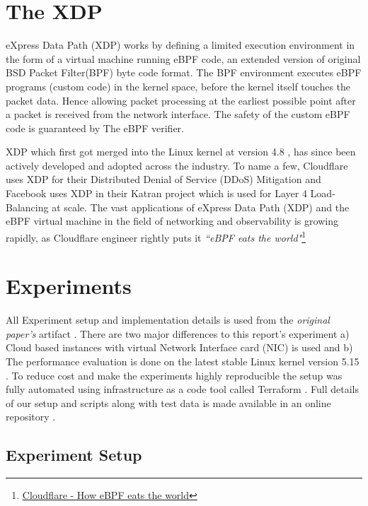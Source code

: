 \documentclass[12pt,titlepage]{article}
\begin{document}
\section{The XDP}

eXpress Data Path (XDP) works by defining a limited execution environment in the form of a virtual machine running eBPF code, an extended version of original BSD Packet Filter(BPF) \cite{mccanne_bsd_1993} byte code format.  The BPF environment executes eBPF programs (custom code) in the kernel space, before the kernel itself touches the packet data. Hence allowing packet processing at the earliest possible point after a packet is received from the network interface. The safety of the custom eBPF code is guaranteed  by The eBPF verifier. 

XDP which first got merged into the Linux kernel at version 4.8 , has since been actively developed and adopted across the industry. To name a few, Cloudflare uses XDP for their Distributed Denial of Service (DDoS) Mitigation \cite{cloudflare-ddos} and Facebook uses XDP in their Katran \cite{katran} project which is used for  Layer 4 Load-Balancing at scale. The vast applications of eXpress Data Path (XDP) and the eBPF virtual machine in the field of networking and observability is growing rapidly,  as Cloudflare engineer rightly puts it \textit{``eBPF  eats the world"}\footnote{\href{https://blog.cloudflare.com/cloudflare-architecture-and-how-bpf-eats-the-world/}{Cloudflare - How eBPF eats the world}} 


\section{Experiments}

All Experiment setup and implementation details is used from the \textit{original paper's} artifact \cite{xdp-test-data} . There are two major differences to this report's experiment a) Cloud based instances with virtual Network Interface card (NIC) is used and b) The performance evaluation is done on the latest stable Linux kernel version 5.15 . To reduce cost and make the experiments highly reproducible  the setup was fully automated using infrastructure as a code tool called Terraform \cite{terra}. Full details of our setup and scripts along with test data is made available in an online repository \cite{xdp-exp}.


\subsection{Experiment Setup}
\end{document}
